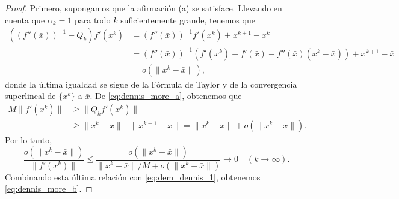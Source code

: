 \begin{proof}
    Primero, supongamos que la afirmación (a) se satisface. Llevando en cuenta que $\alpha_k = 1$ para todo $k$ suficientemente grande, tenemos que
    \begin{align}
        ((f''(\bar{x}))^{-1} - Q_k)f'(x^k) &= (f''(\bar{x}))^{-1}f'(x^k) + x^{k+1} - x^k \nonumber \\
        &= (f''(\bar{x}))^{-1}(f'(x^k) - f'(\bar{x}) - f''(\bar{x})(x^k - \bar{x})) + x^{k+1} - \bar{x} \nonumber \\
        &= o(\|x^k - \bar{x}\|),
        \label{eq:dem_dennis_1}
    \end{align}
    donde la última igualdad se sigue de la Fórmula de Taylor y de la convergencia superlineal de $\{x^k\}$ a $\bar{x}$. De \eqref{eq:dennis_more_a}, obtenemos que
    \begin{align*}
        M\|f'(x^k)\| &\ge \|Q_k f'(x^k)\| \\
        &\ge \|x^k - \bar{x}\| - \|x^{k+1} - \bar{x}\| = \|x^k - \bar{x}\| + o(\|x^k - \bar{x}\|).
    \end{align*}
    Por lo tanto,
    \[
        \frac{o(\|x^k - \bar{x}\|)}{\|f'(x^k)\|} \le \frac{o(\|x^k - \bar{x}\|)}{\|x^k - \bar{x}\|/M + o(\|x^k - \bar{x}\|)} \to 0 \quad (k \to \infty).
    \]
    Combinando esta última relación con \eqref{eq:dem_dennis_1}, obtenemos \eqref{eq:dennis_more_b}.


\end{proof}
